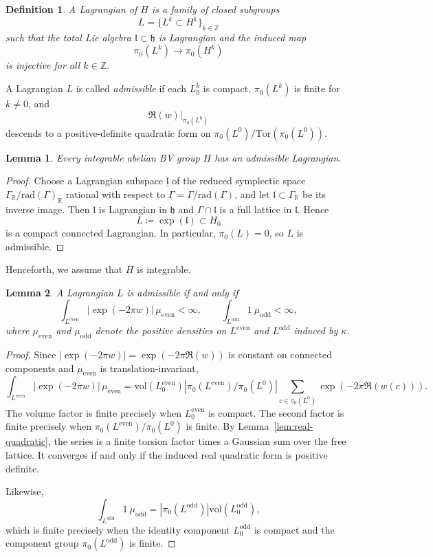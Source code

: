 \documentclass[10pt,a4paper]{amsart}
\numberwithin{table}{section}
\numberwithin{equation}{section}
\newtheorem{defn}{Definition}[section]
\newtheorem{lem}{Lemma}[section]
\newcommand{\fh}{\mathfrak{h}}
\newcommand{\fl}{\mathfrak{l}}
\newcommand{\R}{\mathbb{R}}
\newcommand{\Z}{\mathbb{Z}}
\newcommand{\rad}{\mathrm{rad}}
\newcommand{\Tor}{\mathrm{Tor}}
\newcommand{\vol}{\mathrm{vol}}
\begin{document}
\begin{defn}
	A \emph{Lagrangian} of $H$ is a family of closed subgroups
	\[
	L=\{L^k\subset H^k\}_{k\in\Z}
	\]
	such that the total Lie algebra $\fl\subset\fh$ is Lagrangian and the induced map
	\[
	\pi_0(L^k)\longrightarrow\pi_0(H^k)
	\]
	is injective for all $k\in\Z$.
\end{defn}

A Lagrangian $L$ is called \emph{admissible} if each $L_0^k$ is compact, $\pi_0(L^k)$ is finite for $k\neq 0$, and
\[
\Re(w)\big|_{\pi_0(L^0)}
\]
descends to a positive-definite quadratic form on $\pi_0(L^0)/\Tor(\pi_0(L^0))$. 

\begin{lem}
	Every integrable abelian BV group $H$ has an admissible Lagrangian.
\end{lem}

\begin{proof}
	Choose a Lagrangian subspace $\underline{\fl}$ of the reduced symplectic space $\Gamma_\R/\rad(\Gamma)_\R$ rational with respect to $\underline\Gamma = \Gamma/\rad(\Gamma)$, and let $\fl \subset\Gamma_\R$ be its inverse
	image. Then $\fl$ is Lagrangian in $\fh$ and $\Gamma\cap\fl$ is a full lattice
	in $\fl$. Hence
	\[
	L \coloneq \exp(\fl)\subset H_0
	\]
	is a compact connected Lagrangian. In particular, $\pi_0(L)=0$, so $L$ is admissible.
\end{proof}

Henceforth, we assume that $H$ is integrable.


\begin{lem}\label{lem:integrable-admissible}
	A Lagrangian $L$ is admissible if and only if
	\[
	\int_{L^{\mathrm{even}}} \left|\exp(-2\pi w)\right|\,\mu_{\mathrm{even}}<\infty,
	\qquad
	\int_{L^{\mathrm{odd}}}1\ \mu_{\mathrm{odd}}<\infty,
	\]
	where $\mu_{\mathrm{even}}$ and $\mu_{\mathrm{odd}}$ denote the positive densities on $L^{\mathrm{even}}$ and $L^{\mathrm{odd}}$ induced by $\kappa$.
\end{lem}

\begin{proof}
	Since $|\exp(-2\pi w)|=\exp(-2\pi\Re(w))$ is constant on connected components and $\mu_{\mathrm{even}}$ is translation-invariant,
	\[
	\int_{L^{\mathrm{even}}} \left|\exp(-2\pi w)\right|\,\mu_{\mathrm{even}}
	=
	\vol(L^{\mathrm{even}}_0)
	|\pi_0(L^{\mathrm{even}})/\pi_0(L^0)|
	\sum_{c\in\pi_0(L^0)}\exp(-2\pi\Re(w(c))).
	\]
	The volume factor is finite precisely when $L^{\mathrm{even}}_0$ is compact. The second factor is finite precisely when $\pi_0(L^{\mathrm{even}})/\pi_0(L^0)$ is finite. By Lemma~\ref{lem:real-quadratic}, the series is a finite torsion factor times a Gaussian sum over the free lattice. It converges if and only if the induced real quadratic form is positive definite.
		
	Likewise,
	\[
	\int_{L^{\mathrm{odd}}}1\ \mu_{\mathrm{odd}} = |\pi_0(L^{\mathrm{odd}})|
	\vol(L^{\mathrm{odd}}_0),
	\]
	which is finite precisely when the identity component $L^{\mathrm{odd}}_0$ is compact and the component group $\pi_0(L^{\mathrm{odd}})$ is finite.
\end{proof}
\end{document}
